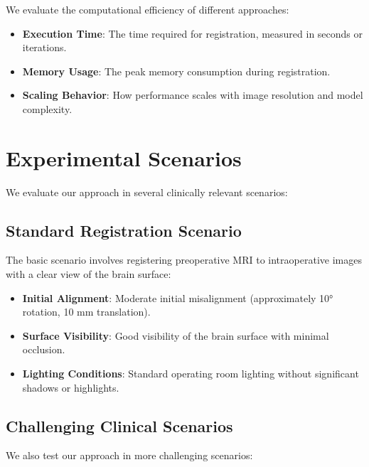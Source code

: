 We evaluate the computational efficiency of different approaches:

\begin{itemize}
    \item \textbf{Execution Time}: The time required for registration, measured in seconds or iterations.
    
    \item \textbf{Memory Usage}: The peak memory consumption during registration.
    
    \item \textbf{Scaling Behavior}: How performance scales with image resolution and model complexity.
\end{itemize}

\section{Experimental Scenarios}

We evaluate our approach in several clinically relevant scenarios:

\subsection{Standard Registration Scenario}

The basic scenario involves registering preoperative MRI to intraoperative images with a clear view of the brain surface:

\begin{itemize}
    \item \textbf{Initial Alignment}: Moderate initial misalignment (approximately 10° rotation, 10 mm translation).
    
    \item \textbf{Surface Visibility}: Good visibility of the brain surface with minimal occlusion.
    
    \item \textbf{Lighting Conditions}: Standard operating room lighting without significant shadows or highlights.
\end{itemize}

\subsection{Challenging Clinical Scenarios}

We also test our approach in more challenging scenarios:

